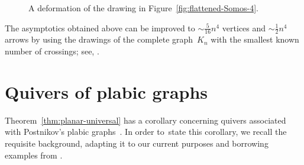 \documentclass[ALCO,ThmDefs,Unicode,epreuves,published]{cedram}
\begin{document}
\begin{figure}[ht]\centering
{}

\caption{A deformation of the drawing in Figure~\ref{fig:flattened-Somos-4}.}
\label{fig:very-flattened-Somos-4}
\end{figure}

\begin{remark}
The asymptotics obtained above can be improved to $\sim\frac5{16} n^4$ vertices and $\sim \frac12 n^4$ arrows by using the drawings of the complete graph~$K_n$ with the smallest known number of crossings; see, \eg \cite[Section~13.2]{szekely}. 
\end{remark}


\section{Quivers of plabic graphs}
\label{sec:quivers-plabic}

Theorem~\ref{thm:planar-universal} has a corollary concerning quivers
associated with Postnikov's plabic graphs~\cite{postnikov}. 
In order to~state this corollary, we recall the requisite background,
adapting it to our current purposes and borrowing examples from
\cite[Section~6]{FPST}. 
\end{document}
